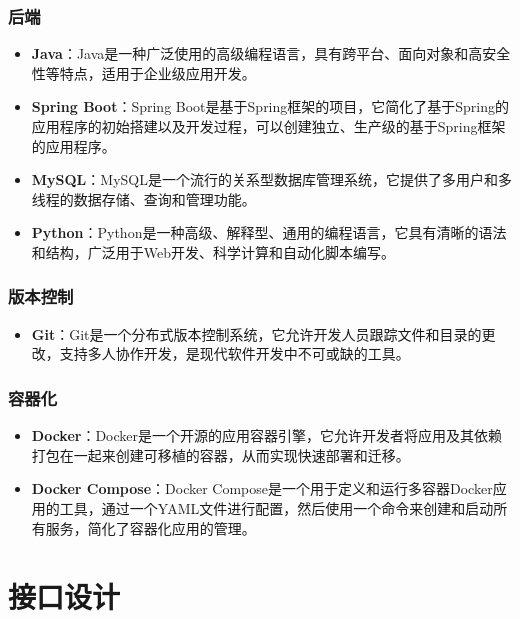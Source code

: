 \documentclass[12pt]{article}
\begin{document}
\subsubsection{后端}
\begin{itemize}
    \item \textbf{Java}：Java是一种广泛使用的高级编程语言，具有跨平台、面向对象和高安全性等特点，适用于企业级应用开发。
    \item \textbf{Spring Boot}：Spring Boot是基于Spring框架的项目，它简化了基于Spring的应用程序的初始搭建以及开发过程，可以创建独立、生产级的基于Spring框架的应用程序。
    \item \textbf{MySQL}：MySQL是一个流行的关系型数据库管理系统，它提供了多用户和多线程的数据存储、查询和管理功能。
    \item \textbf{Python}：Python是一种高级、解释型、通用的编程语言，它具有清晰的语法和结构，广泛用于Web开发、科学计算和自动化脚本编写。
\end{itemize}

\subsubsection{版本控制}
\begin{itemize}
    \item \textbf{Git}：Git是一个分布式版本控制系统，它允许开发人员跟踪文件和目录的更改，支持多人协作开发，是现代软件开发中不可或缺的工具。
\end{itemize}

\subsubsection{容器化}
\begin{itemize}
    \item \textbf{Docker}：Docker是一个开源的应用容器引擎，它允许开发者将应用及其依赖打包在一起来创建可移植的容器，从而实现快速部署和迁移。
    \item \textbf{Docker Compose}：Docker Compose是一个用于定义和运行多容器Docker应用的工具，通过一个YAML文件进行配置，然后使用一个命令来创建和启动所有服务，简化了容器化应用的管理。
\end{itemize}

\section{接口设计}
\end{document}
